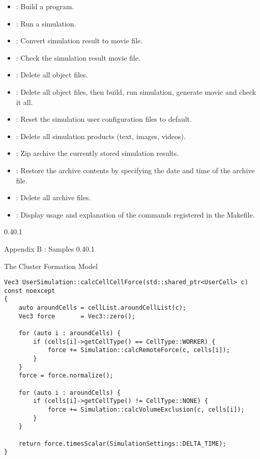 \documentclass[vipdfmx,a4paper,11pt]{jsarticle}
\makeatletter
\renewcommand{\section}{%
  \@startsection{section}{1}{\z@}%
  {0.4\Cvs}{0.1\Cvs}%
  {\normalfont\large\headfont\raggedright}}
\renewcommand{\subsubsection}{%
  \@startsection{subsubsection}{1}{\z@}%
  {0.4\Cvs}{0.1\Cvs}%
  {\normalfont\large\headfont\raggedright}}
\makeatother
\begin{document}
\begin{itemize}
  \item {} : Build a program.
  \item {} : Run a simulation.
  \item {} : Convert simulation result to movie file.
  \item {} : Check the simulation result movie file.
  \item {} : Delete all object files.
  \item {} : Delete all object files, then build, run simulation, generate movie and check it all.
  \item {} : Reset the simulation user configuration files to default.
  \item {} : Delete all simulation products (text, images, videos).
  \item {} : Zip archive the currently stored simulation results.
  \item {} : Restore the archive contents by specifying the date and time of the archive file.
  \item {} : Delete all archive files.
  \item {} : Display usage and explanation of the commands registered in the Makefile.
\end{itemize}

\section{Appendix B : Samples}
\subsubsection{The Cluster Formation Model}
\begin{lstlisting}[caption=calcCellCellForce()]
Vec3 UserSimulation::calcCellCellForce(std::shared_ptr<UserCell> c) const noexcept
{
    auto aroundCells = cellList.aroundCellList(c);
    Vec3 force       = Vec3::zero();

    for (auto i : aroundCells) {
        if (cells[i]->getCellType() == CellType::WORKER) {
            force += Simulation::calcRemoteForce(c, cells[i]);
        }
    }
    force = force.normalize();

    for (auto i : aroundCells) {
        if (cells[i]->getCellType() != CellType::NONE) {
            force += Simulation::calcVolumeExclusion(c, cells[i]);
        }
    }

    return force.timesScalar(SimulationSettings::DELTA_TIME);
}
\end{lstlisting}
\end{document}
